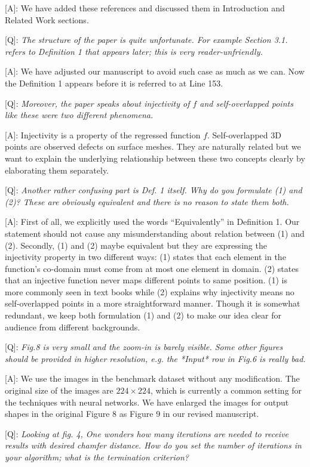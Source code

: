 \documentclass[10pt]{letter} %
\begin{document}
	[A]: We have added these references and discussed them in Introduction and Related Work sections.
	
	[Q]: \emph{The structure of the paper is quite unfortunate. For example Section 3.1. refers to Definition 1 that appears later; this is very reader-unfriendly.}
	
	[A]: We have adjusted our manuscript to avoid such case as much as we can. Now the Definition 1 appears before it is referred to at Line 153.
	
	[Q]: \emph{Moreover, the paper speaks about injectivity of $f$ and self-overlapped points like these were two different phenomena.}
	
	[A]: Injectivity is a property of the regressed function $f$. Self-overlapped 3D points are observed defects on surface meshes. They are naturally related but we want to explain the underlying relationship between these two concepts clearly by elaborating them separately.
	
	[Q]: \emph{Another rather confusing part is Def. 1 itself. Why do you formulate (1) and (2)? These are obviously equivalent and there is no reason to state them both.}
	
	[A]: First of all, we explicitly used the words ``Equivalently'' in Definition 1. Our statement should not cause any misunderstanding about relation between (1) and (2). Secondly, (1) and (2) maybe equivalent but they are expressing the injectivity property in two different ways: (1) states that each element in the function's co-domain must come from at most one element in domain. (2) states that an injective function never maps different points to same position. (1) is more commonly seen in text books while (2) explains why injectivity means no self-overlapped points in a more straightforward manner. Though it is somewhat redundant, we keep both formulation (1) and (2) to make our idea clear for audience from different backgrounds.
	
	[Q]: \emph{Fig.8 is very small and the zoom-in is barely visible.  Some other figures should be provided in higher resolution, e.g. the *Input* row in Fig.6 is really bad.} 
	
	[A]: We use the images in the benchmark dataset without any modification. The original size of the images are $224 \times 224$, which is currently a common setting for the techniques with neural networks. We have enlarged the images for output shapes in the original Figure 8 as Figure 9 in our revised manuscript.
	
	[Q]: \emph{Looking at fig. 4, One wonders how many iterations are needed to receive results with desired chamfer distance. How do you set the number of iterations in your algorithm; what is the termination criterion?}
	
\end{document}
